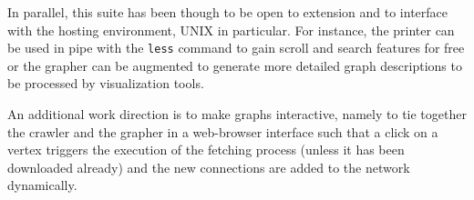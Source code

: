 In parallel, this suite has been though to be open to extension
and to interface with the hosting environment, UNIX in particular. For
instance, the printer can be used in pipe with the \verb|less| command to gain
scroll and search features for free or the grapher can be augmented to generate
more detailed graph descriptions to be processed by visualization tools.

An additional work direction is to make graphs interactive, namely to tie
together the crawler and the grapher in a web-browser interface such that a
click on a vertex triggers the execution of the fetching process (unless it has
been downloaded already) and the new connections are added to the network
dynamically.




\iffalse

\begin{figure}
\texttt{[image: deps/oeis-tools/doc/OEIS/fibonacci-catalan]}
\caption{Sequences network fetched by commands issued in the discussed session.}
\label{fig:oeis:sequences:network}
\end{figure}

\notbreakable{
    \inputminted[fontsize=\small,stripnl=false,firstline=31,lastline=44]
        {python}{deps/oeis-tools/src/graphing.py}
}

\notbreakable{
    \inputminted[fontsize=\small,stripnl=false,firstline=46,lastline=76]
        {python}{deps/oeis-tools/src/graphing.py}
}

\fi
